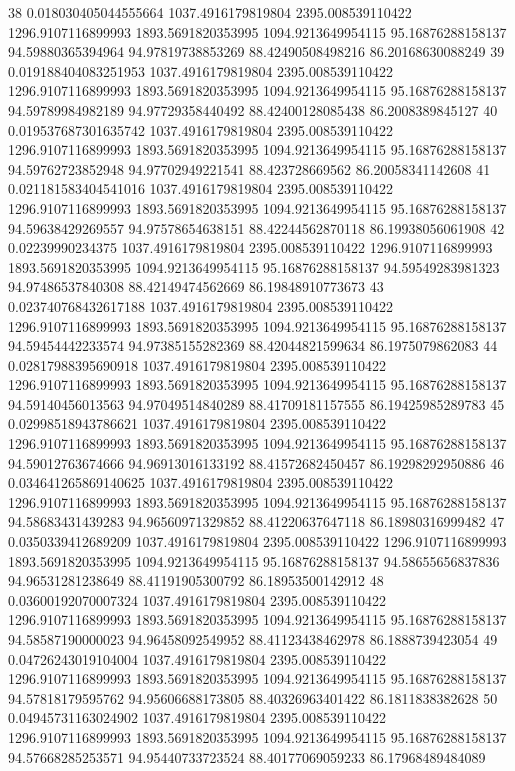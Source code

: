 {38 0.018030405044555664 1037.4916179819804 2395.008539110422 1296.9107116899993 1893.5691820353995 1094.9213649954115 95.16876288158137 94.59880365394964 94.97819738853269 88.42490508498216 86.20168630088249
39 0.019188404083251953 1037.4916179819804 2395.008539110422 1296.9107116899993 1893.5691820353995 1094.9213649954115 95.16876288158137 94.59789984982189 94.97729358440492 88.42400128085438 86.2008389845127
40 0.019537687301635742 1037.4916179819804 2395.008539110422 1296.9107116899993 1893.5691820353995 1094.9213649954115 95.16876288158137 94.59762723852948 94.97702949221541 88.423728669562 86.20058341142608
41 0.021181583404541016 1037.4916179819804 2395.008539110422 1296.9107116899993 1893.5691820353995 1094.9213649954115 95.16876288158137 94.59638429269557 94.97578654638151 88.42244562870118 86.19938056061908
42 0.02239990234375 1037.4916179819804 2395.008539110422 1296.9107116899993 1893.5691820353995 1094.9213649954115 95.16876288158137 94.59549283981323 94.97486537840308 88.42149474562669 86.19848910773673
43 0.023740768432617188 1037.4916179819804 2395.008539110422 1296.9107116899993 1893.5691820353995 1094.9213649954115 95.16876288158137 94.59454442233574 94.97385155282369 88.42044821599634 86.1975079862083
44 0.02817988395690918 1037.4916179819804 2395.008539110422 1296.9107116899993 1893.5691820353995 1094.9213649954115 95.16876288158137 94.59140456013563 94.97049514840289 88.41709181157555 86.19425985289783
45 0.02998518943786621 1037.4916179819804 2395.008539110422 1296.9107116899993 1893.5691820353995 1094.9213649954115 95.16876288158137 94.59012763674666 94.96913016133192 88.41572682450457 86.19298292950886
46 0.034641265869140625 1037.4916179819804 2395.008539110422 1296.9107116899993 1893.5691820353995 1094.9213649954115 95.16876288158137 94.58683431439283 94.96560971329852 88.41220637647118 86.18980316999482
47 0.0350339412689209 1037.4916179819804 2395.008539110422 1296.9107116899993 1893.5691820353995 1094.9213649954115 95.16876288158137 94.58655656837836 94.96531281238649 88.41191905300792 86.18953500142912
48 0.03600192070007324 1037.4916179819804 2395.008539110422 1296.9107116899993 1893.5691820353995 1094.9213649954115 95.16876288158137 94.58587190000023 94.96458092549952 88.41123438462978 86.1888739423054
49 0.04726243019104004 1037.4916179819804 2395.008539110422 1296.9107116899993 1893.5691820353995 1094.9213649954115 95.16876288158137 94.57818179595762 94.95606688173805 88.40326963401422 86.1811838382628
50 0.04945731163024902 1037.4916179819804 2395.008539110422 1296.9107116899993 1893.5691820353995 1094.9213649954115 95.16876288158137 94.57668285253571 94.95440733723524 88.40177069059233 86.17968489484089
}
